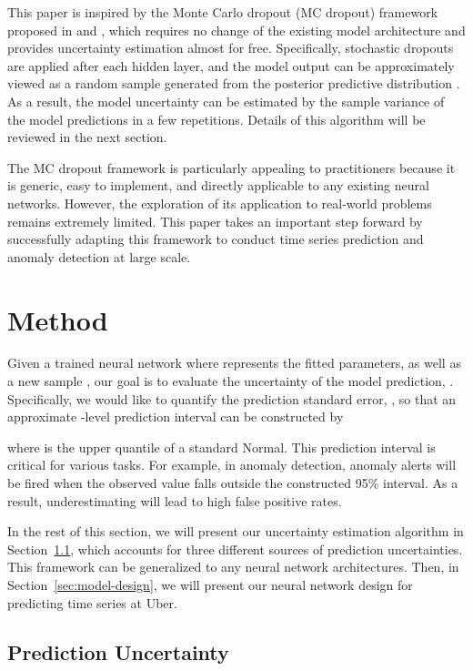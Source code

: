 \documentclass[conference,compsoc,final]{IEEEtran}
\begin{document}
This paper is inspired by the Monte Carlo dropout (MC dropout) framework proposed in \cite{gal2016dropout} and \cite{Gal2015Theoretically}, which requires no change of the existing model architecture and provides uncertainty estimation almost for free. Specifically, stochastic dropouts are applied after each hidden layer, and the model output can be approximately viewed as a random sample generated from the posterior predictive distribution \cite{gal2016uncertainty}. As a result, the model uncertainty can be estimated by the sample variance of the model predictions in a few repetitions. Details of this algorithm will be reviewed in the next section. 

The MC dropout framework is particularly appealing to practitioners because it is generic, easy to implement, and directly applicable to any existing neural networks.  
However, the exploration of its application to real-world problems remains extremely limited. This paper takes an important step forward by successfully adapting this framework to conduct time series prediction and anomaly detection at large scale.


 

\section{Method}
\label{sec:method}

Given a trained neural network  where  represents the fitted parameters, as well as a new sample , our goal is to evaluate the uncertainty of the model prediction, . Specifically, we would like to quantify the prediction standard error, , so that an approximate -level prediction interval can be constructed by 

where  is the upper  quantile of a standard Normal. This prediction interval is critical for various tasks. For example, in anomaly detection, anomaly alerts will be fired when the observed value falls outside the constructed 95\% interval. As a result, underestimating  will lead to high false positive rates.

In the rest of this section, we will present our uncertainty estimation algorithm in Section~\ref{sec:uncertainty}, which accounts for three different sources of prediction uncertainties. This framework can be generalized to any neural network architectures. Then, in Section~\ref{sec:model-design}, we will present our neural network design for predicting time series at Uber.

\subsection{Prediction Uncertainty}
\label{sec:uncertainty}
\end{document}
